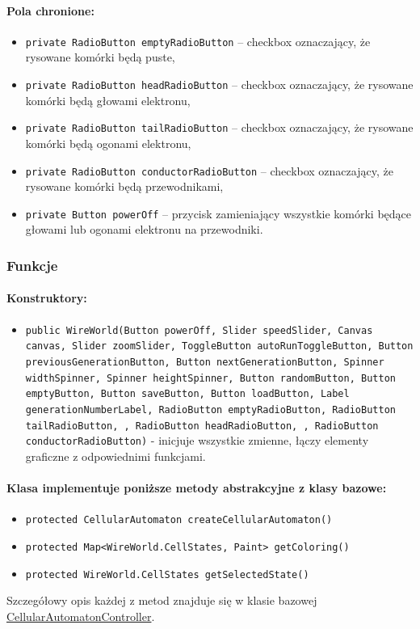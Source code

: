 \documentclass{report}
\begin{document}
\paragraph{Pola chronione:}
\begin{itemize}	\label{sec:checkbox}
	\item \texttt{private RadioButton emptyRadioButton} -- checkbox oznaczający, że rysowane komórki będą puste,
	\item \texttt{private RadioButton headRadioButton} -- checkbox oznaczający, że rysowane komórki będą głowami elektronu,
	\item \texttt{private RadioButton tailRadioButton} -- checkbox oznaczający, że rysowane komórki będą ogonami elektronu,
	\item \texttt{private RadioButton conductorRadioButton} -- checkbox oznaczający, że rysowane komórki będą przewodnikami,
	\item \texttt{private Button powerOff} -- przycisk zamieniający wszystkie komórki będące głowami lub ogonami elektronu na przewodniki.
\end{itemize}

\subsubsection{Funkcje}
\paragraph{Konstruktory:}
\begin{itemize}
\item \texttt{public WireWorld(Button powerOff, Slider speedSlider, Canvas canvas, Slider zoomSlider, ToggleButton autoRunToggleButton, Button previousGenerationButton, Button nextGenerationButton, Spinner widthSpinner, Spinner heightSpinner, Button randomButton, Button emptyButton, Button saveButton, Button loadButton, Label generationNumberLabel, RadioButton emptyRadioButton, RadioButton tailRadioButton, , RadioButton headRadioButton, , RadioButton conductorRadioButton)} - inicjuje wszystkie zmienne, łączy elementy graficzne z odpowiednimi funkcjami.
\end{itemize}
\paragraph{Klasa implementuje poniższe metody abstrakcyjne z klasy bazowe:}
\begin{itemize}
	\item \texttt{protected CellularAutomaton createCellularAutomaton()}
	\item \texttt{protected Map<WireWorld.CellStates, Paint> getColoring()} 
	\item \texttt{protected WireWorld.CellStates getSelectedState()}
\end{itemize}
Szczegółowy opis każdej z metod znajduje się w klasie bazowej \hyperref[]{CellularAutomatonController}.
\end{document}

